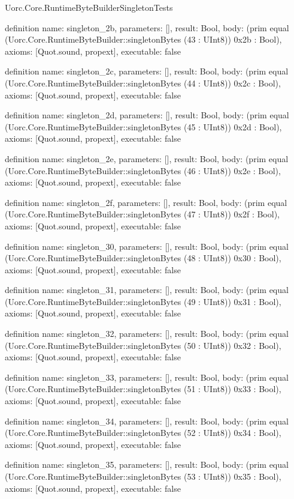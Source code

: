 \begin{lexlean}{Uorc.Core.RuntimeByteBuilderSingletonTests}
\begin{semanticmodule}
definition{
  name: singleton_2b,
  parameters: [],
  result: Bool,
  body: (prim equal (Uorc.Core.RuntimeByteBuilder::singletonBytes (43 : UInt8)) 0x2b : Bool),
  axioms: [Quot.sound, propext],
  executable: false
}

definition{
  name: singleton_2c,
  parameters: [],
  result: Bool,
  body: (prim equal (Uorc.Core.RuntimeByteBuilder::singletonBytes (44 : UInt8)) 0x2c : Bool),
  axioms: [Quot.sound, propext],
  executable: false
}

definition{
  name: singleton_2d,
  parameters: [],
  result: Bool,
  body: (prim equal (Uorc.Core.RuntimeByteBuilder::singletonBytes (45 : UInt8)) 0x2d : Bool),
  axioms: [Quot.sound, propext],
  executable: false
}

definition{
  name: singleton_2e,
  parameters: [],
  result: Bool,
  body: (prim equal (Uorc.Core.RuntimeByteBuilder::singletonBytes (46 : UInt8)) 0x2e : Bool),
  axioms: [Quot.sound, propext],
  executable: false
}

definition{
  name: singleton_2f,
  parameters: [],
  result: Bool,
  body: (prim equal (Uorc.Core.RuntimeByteBuilder::singletonBytes (47 : UInt8)) 0x2f : Bool),
  axioms: [Quot.sound, propext],
  executable: false
}

definition{
  name: singleton_30,
  parameters: [],
  result: Bool,
  body: (prim equal (Uorc.Core.RuntimeByteBuilder::singletonBytes (48 : UInt8)) 0x30 : Bool),
  axioms: [Quot.sound, propext],
  executable: false
}

definition{
  name: singleton_31,
  parameters: [],
  result: Bool,
  body: (prim equal (Uorc.Core.RuntimeByteBuilder::singletonBytes (49 : UInt8)) 0x31 : Bool),
  axioms: [Quot.sound, propext],
  executable: false
}

definition{
  name: singleton_32,
  parameters: [],
  result: Bool,
  body: (prim equal (Uorc.Core.RuntimeByteBuilder::singletonBytes (50 : UInt8)) 0x32 : Bool),
  axioms: [Quot.sound, propext],
  executable: false
}

definition{
  name: singleton_33,
  parameters: [],
  result: Bool,
  body: (prim equal (Uorc.Core.RuntimeByteBuilder::singletonBytes (51 : UInt8)) 0x33 : Bool),
  axioms: [Quot.sound, propext],
  executable: false
}

definition{
  name: singleton_34,
  parameters: [],
  result: Bool,
  body: (prim equal (Uorc.Core.RuntimeByteBuilder::singletonBytes (52 : UInt8)) 0x34 : Bool),
  axioms: [Quot.sound, propext],
  executable: false
}

definition{
  name: singleton_35,
  parameters: [],
  result: Bool,
  body: (prim equal (Uorc.Core.RuntimeByteBuilder::singletonBytes (53 : UInt8)) 0x35 : Bool),
  axioms: [Quot.sound, propext],
  executable: false
}


\end{semanticmodule}
\end{lexlean}
